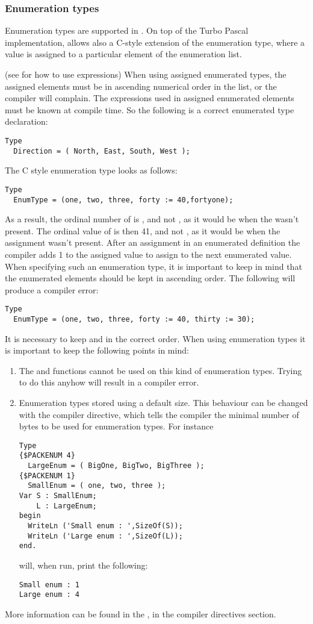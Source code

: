 \subsubsection{Enumeration types}
Enumeration types are supported in \fpc. On top of the Turbo Pascal
implementation, \fpc allows also a C-style extension of the
enumeration type, where a value is assigned to a particular element of
the enumeration list.

(see  for how to use expressions)
When using assigned enumerated types, the assigned elements must be in
ascending numerical order in the list, or the compiler will complain.
The expressions used in assigned enumerated elements must be known at
compile time.
So the following is a correct enumerated type declaration:
\begin{verbatim}
Type
  Direction = ( North, East, South, West );
\end{verbatim}
The C style enumeration type looks as follows:
\begin{verbatim}
Type
  EnumType = (one, two, three, forty := 40,fortyone);
\end{verbatim}
As a result, the ordinal number of  is , and not ,
as it would be when the  wasn't present.
The ordinal value of  is then {41}, and not , as it
would be when the assignment wasn't present. After an assignment in an
enumerated definition the compiler adds 1 to the assigned value to assign to
the next enumerated value.
When specifying such an enumeration type, it is important to keep in mind
that the enumerated elements should be kept in ascending order. The
following will produce a compiler error:
\begin{verbatim}
Type
  EnumType = (one, two, three, forty := 40, thirty := 30);
\end{verbatim}
It is necessary to keep  and  in the correct order.
When using enumeration types it is important to keep the following points
in mind:
\begin{enumerate}
\item The  and  functions cannot be used on
this kind of enumeration types. Trying to do this anyhow will result in a
compiler error.
\item Enumeration types stored using a default size. This behaviour can be changed
with the  compiler directive, which
tells the compiler the minimal number of bytes to be used for enumeration
types.
For instance
\begin{verbatim}
Type
{$PACKENUM 4}
  LargeEnum = ( BigOne, BigTwo, BigThree );
{$PACKENUM 1}
  SmallEnum = ( one, two, three );
Var S : SmallEnum;
    L : LargeEnum;
begin
  WriteLn ('Small enum : ',SizeOf(S));
  WriteLn ('Large enum : ',SizeOf(L));
end.
\end{verbatim}
will, when run, print the following:
\begin{verbatim}
Small enum : 1
Large enum : 4
\end{verbatim}
\end{enumerate}
More information can be found in the \progref, in the compiler directives
section.
